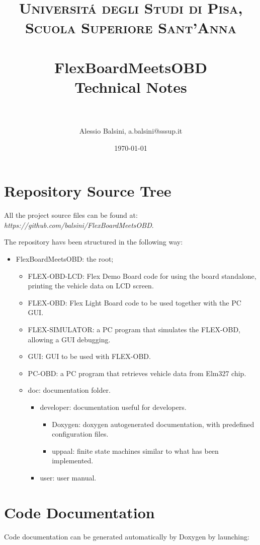 \documentclass[paper=a4, fontsize=11pt]{scrartcl} %
\title{	
\normalfont \normalsize 
\textsc{Universit\'a degli Studi di Pisa, Scuola Superiore Sant'Anna} \\ [25pt] %
\horrule{0.5pt} \\[0.4cm] %
\huge FlexBoardMeetsOBD \\ %
\large Technical Notes \\
\horrule{2pt} \\[0.5cm] %
}
\author{Alessio Balsini, a.balsini@sssup.it} %
\date{\normalsize\today} %
\numberwithin{equation}{section} %
\numberwithin{figure}{section} %
\numberwithin{table}{section} %
\begin{document}
\maketitle %

\section{Repository Source Tree}

All the project source files can be found at: \emph{https://github.com/balsini/FlexBoardMeetsOBD}.

The repository havs been structured in the following way:

\begin{itemize}
	\item FlexBoardMeetsOBD: the root;
		\begin{itemize}
		\item FLEX-OBD-LCD: Flex Demo Board code for using the board standalone, printing the vehicle data on LCD screen.
		\item FLEX-OBD: Flex Light Board code to be used together with the PC GUI.
		\item FLEX-SIMULATOR: a PC program that simulates the FLEX-OBD, allowing a GUI debugging.
		\item GUI: GUI to be used with FLEX-OBD.
		\item PC-OBD: a PC program that retrieves vehicle data from Elm327 chip.
		\item doc: documentation folder.
		\begin{itemize}
			\item developer: documentation useful for developers.
			\begin{itemize}
				\item Doxygen: doxygen autogenerated documentation, with predefined configuration files.
				\item uppaal: finite state machines similar to what has been implemented.
			\end{itemize}
			\item user: user manual.
		\end{itemize}
		\end{itemize}
\end{itemize}

\section{Code Documentation}

Code documentation can be generated automatically by Doxygen by launching:
\end{document}
